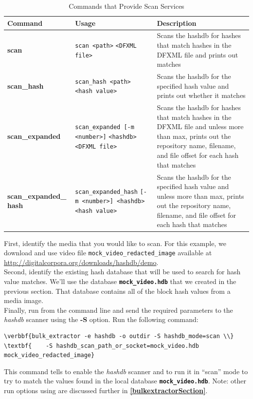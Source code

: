 \documentclass[11pt,fleqn]{article} %
\begin{document}
\begin{table}[!ht]
\centering
\caption{Commands that Provide Scan Services}
\label{tab:scanServices}
\begin{tabular}{|p{3.5 cm}|p{6 cm}|p{4 cm}|}
\hline \hline
\textbf{Command} & \textbf{Usage} & \textbf{Description} \\
\hline
\textbf{scan} & \verb+scan <path>+ \verb+<DFXML file>+ & Scans the hashdb for hashes that match hashes in the DFXML file and prints out matches\\
\hline
\textbf{scan\_hash} & \verb+scan_hash <path>+ \verb+<hash value>+ & Scans the hashdb for the specified hash value and prints out whether it matches\\
\hline
\textbf{scan\_expanded} & \verb+scan_expanded [-m <number>]+ \verb+<hashdb> <DFXML file>+ & Scans the hashdb for hashes that match hashes in the DFXML file and unless more than max, prints out the repository name, filename, and file offset for each hash that matches\\
\hline
\textbf{scan\_expanded\_} \textbf{hash} & \verb+scan_expanded_hash+ \verb+[-m <number>] <hashdb>+ \verb+<hash value>+ & Scans the hashdb for the specified hash value and unless more than max, prints out the repository name, filename, and file offset for each hash that matches\\
\hline
\end{tabular}
\end{table}

First, identify the media that you would like to scan. For this example, we download and use video file \texttt{mock\_video\_redacted\_image} available at \url{http://digitalcorpora.org/downloads/hashdb/demo}.\\ 

Second, identify the existing hash database that will be used to search for hash value matches. We'll use the database \texttt{\textbf{mock\_video.hdb}} that we created in the previous section. That database contains all of the block hash values from a media image. \\

Finally, run \bulk from the command line and send the required parameters to the \textit{hashdb} scanner using the \textbf{-S} option. Run the following command: 
\begin{Verbatim}[commandchars=\\\{\}]
\verbbf{bulk_extractor -e hashdb -o outdir -S hashdb_mode=scan \\}
\textbf{    -S hashdb_scan_path_or_socket=mock_video.hdb mock_video_redacted_image}
\end{Verbatim}
This command tells \bulk to enable the \textit{hashdb} scanner and to run it in ``scan'' mode to try to match the values found in the local database \texttt{\textbf{mock\_video.hdb}}. Note: other run options using \bulk are discussed further in \textbf{\autoref{bulkextractorSection}}.\\
\end{document}
